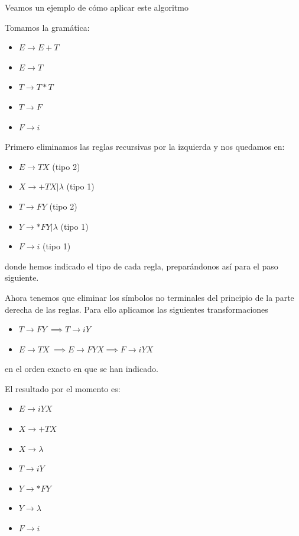 \documentclass{apuntes}
\begin{document}
Veamos un ejemplo de cómo aplicar este algoritmo
\begin{example}
Tomamos la gramática:
\begin{itemize}
\item $E \rightarrow E+T$
\item $E \rightarrow T$
\item $T \rightarrow T*T$
\item $T \rightarrow F$
\item $F \rightarrow i$
\end{itemize}
Primero eliminamos las reglas recursivas por la izquierda y nos quedamos en:
\begin{itemize}
\item $E \rightarrow TX$ (tipo 2)
\item $X \rightarrow +TX|λ$ (tipo 1)
\item $T \rightarrow FY$ (tipo 2)
\item $Y \rightarrow *FY|λ$ (tipo 1)
\item $F \rightarrow i$ (tipo 1)
\end{itemize}
donde hemos indicado el tipo de cada regla, preparándonos así para el paso siguiente.

Ahora tenemos que eliminar los símbolos no terminales del principio de la parte derecha de las reglas. Para ello aplicamos las siguientes transformaciones
\begin{itemize}
\item $T \rightarrow FY \ \implies T \rightarrow iY$
\item $E \rightarrow TX \ \implies E \rightarrow FYX \implies F \rightarrow iYX$
\end{itemize}
en el orden exacto en que se han indicado.

El resultado por el momento es:
\begin{itemize}
\item $E \rightarrow iYX$
\item $X \rightarrow +TX$
\item $X \rightarrow λ$
\item $T \rightarrow iY$
\item $Y \rightarrow *FY$
\item $Y \rightarrow λ$
\item $F \rightarrow i$
\end{itemize}


\end{example}
\end{document}
